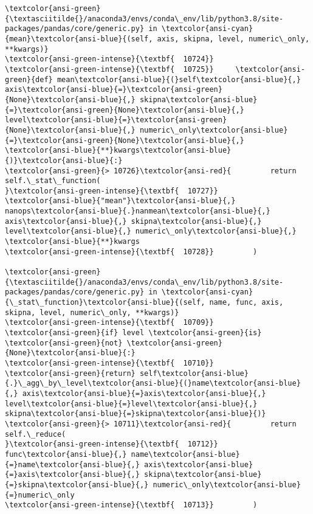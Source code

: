 \documentclass[11pt]{article}
\begin{document}
\begin{Verbatim}[commandchars=\\\{\}, frame=single, framerule=2mm, rulecolor=\color{outerrorbackground}]
\textcolor{ansi-green}{\textasciitilde{}/anaconda3/envs/conda\_env/lib/python3.8/site-packages/pandas/core/generic.py} in \textcolor{ansi-cyan}{mean}\textcolor{ansi-blue}{(self, axis, skipna, level, numeric\_only, **kwargs)}
\textcolor{ansi-green-intense}{\textbf{  10724}} 
\textcolor{ansi-green-intense}{\textbf{  10725}}     \textcolor{ansi-green}{def} mean\textcolor{ansi-blue}{(}self\textcolor{ansi-blue}{,} axis\textcolor{ansi-blue}{=}\textcolor{ansi-green}{None}\textcolor{ansi-blue}{,} skipna\textcolor{ansi-blue}{=}\textcolor{ansi-green}{None}\textcolor{ansi-blue}{,} level\textcolor{ansi-blue}{=}\textcolor{ansi-green}{None}\textcolor{ansi-blue}{,} numeric\_only\textcolor{ansi-blue}{=}\textcolor{ansi-green}{None}\textcolor{ansi-blue}{,} \textcolor{ansi-blue}{**}kwargs\textcolor{ansi-blue}{)}\textcolor{ansi-blue}{:}
\textcolor{ansi-green}{> 10726}\textcolor{ansi-red}{         return self.\_stat\_function(
}\textcolor{ansi-green-intense}{\textbf{  10727}}             \textcolor{ansi-blue}{"mean"}\textcolor{ansi-blue}{,} nanops\textcolor{ansi-blue}{.}nanmean\textcolor{ansi-blue}{,} axis\textcolor{ansi-blue}{,} skipna\textcolor{ansi-blue}{,} level\textcolor{ansi-blue}{,} numeric\_only\textcolor{ansi-blue}{,} \textcolor{ansi-blue}{**}kwargs
\textcolor{ansi-green-intense}{\textbf{  10728}}         )

\textcolor{ansi-green}{\textasciitilde{}/anaconda3/envs/conda\_env/lib/python3.8/site-packages/pandas/core/generic.py} in \textcolor{ansi-cyan}{\_stat\_function}\textcolor{ansi-blue}{(self, name, func, axis, skipna, level, numeric\_only, **kwargs)}
\textcolor{ansi-green-intense}{\textbf{  10709}}         \textcolor{ansi-green}{if} level \textcolor{ansi-green}{is} \textcolor{ansi-green}{not} \textcolor{ansi-green}{None}\textcolor{ansi-blue}{:}
\textcolor{ansi-green-intense}{\textbf{  10710}}             \textcolor{ansi-green}{return} self\textcolor{ansi-blue}{.}\_agg\_by\_level\textcolor{ansi-blue}{(}name\textcolor{ansi-blue}{,} axis\textcolor{ansi-blue}{=}axis\textcolor{ansi-blue}{,} level\textcolor{ansi-blue}{=}level\textcolor{ansi-blue}{,} skipna\textcolor{ansi-blue}{=}skipna\textcolor{ansi-blue}{)}
\textcolor{ansi-green}{> 10711}\textcolor{ansi-red}{         return self.\_reduce(
}\textcolor{ansi-green-intense}{\textbf{  10712}}             func\textcolor{ansi-blue}{,} name\textcolor{ansi-blue}{=}name\textcolor{ansi-blue}{,} axis\textcolor{ansi-blue}{=}axis\textcolor{ansi-blue}{,} skipna\textcolor{ansi-blue}{=}skipna\textcolor{ansi-blue}{,} numeric\_only\textcolor{ansi-blue}{=}numeric\_only
\textcolor{ansi-green-intense}{\textbf{  10713}}         )


\end{Verbatim}
\end{document}
